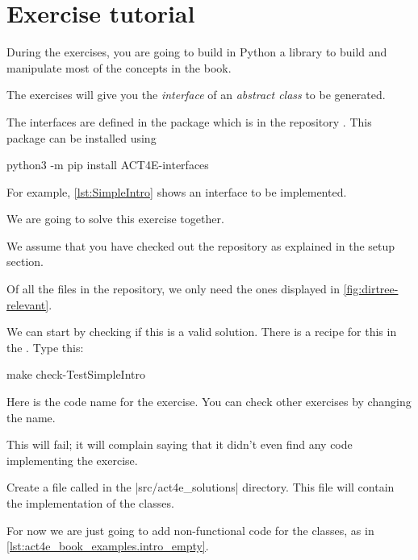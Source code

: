 
\section{Exercise tutorial}
\label{sec:exercise-tutorial}

During the exercises, you are going to build in Python a library to build and manipulate most of the concepts in the book.

The exercises will give you the \emph{interface} of an \emph{abstract class} to be generated.

The interfaces are defined in the package  which is in the repository .
This package can be installed using

\begin{console}
    python3 -m pip install ACT4E-interfaces
\end{console}

For example, \cref{lst:SimpleIntro} shows an interface  to be implemented.


We are going to solve this exercise together.

We assume that you have checked out the repository as explained in the setup section.

Of all the files in the repository, we only need the ones displayed in \cref{fig:dirtree-relevant}.

We can start by checking if this is a valid solution.
There is a recipe for this in the .
Type this:

\begin{console}
    make check-TestSimpleIntro
\end{console}

Here  is the code name for the exercise.
You can check other exercises by changing the name.

This will fail; it will complain saying that it didn't even find any code implementing the exercise.

Create a file called  in the \files|src/act4e_solutions| directory.
This file will contain the implementation of the classes.

For now we are just going to add non-functional code for the classes, as in \cref{lst:act4e_book_examples.intro_empty}.

\begin{longcode}
    \caption{}

    \label{lst:act4e_book_examples.intro_empty}
\end{longcode}

